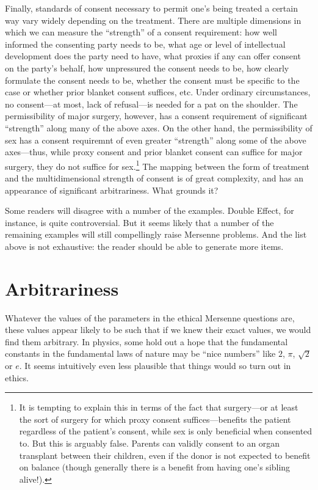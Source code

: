 Finally, standards of consent necessary to permit one's being treated a certain way vary widely depending on the treatment.
There are multiple dimensions in which we can measure the ``strength'' of a consent requirement: how well informed the 
consenting party needs to be, what age or level of intellectual development does the party need to have, what proxies if
any can offer consent on the party's behalf, how unpressured the consent needs to be, how clearly formulate the consent
needs to be, whether the consent must be specific to the case or whether prior blanket consent suffices, etc.
Under ordinary circumstances, no consent---at most, lack of refusal---is needed for a pat on the shoulder. The permissibility
of major surgery, however, has a consent requirement of significant ``strength'' along many of the above axes. On the other hand,
the permissibility of sex has a consent requiremnt of even greater ``strength'' along some of the above axes---thus, while
proxy consent and prior blanket consent can suffice for major surgery, they do not suffice for sex.\footnote{It is tempting
to explain this in terms of the fact that surgery---or at least the sort of surgery for which proxy consent suffices---benefits 
the patient regardless of the patient's consent, while sex is only beneficial when consented to. But this is arguably false.
Parents can validly consent to an organ transplant between their children, even if the donor is not expected to benefit
on balance (though generally there is a benefit from having one's sibling alive!).} The mapping between
the form of treatment and the multidimensional strength of consent is of great complexity, and has an appearance of significant
arbitrariness. What grounds it?

Some readers will disagree with a number of the examples. Double Effect, for instance, is quite controversial. But it seems
likely that a number of the remaining examples will still compellingly raise Mersenne problems. And the list above is not
exhaustive: the reader should be able to generate more items.

\section{Arbitrariness}
Whatever the values of the parameters in the ethical Mersenne questions are, these values appear likely to be such 
that if we knew their exact values, we would find them arbitrary.
In physics, some hold out a hope that the fundamental constants in the fundamental laws of nature may be ``nice numbers'' like
$2$, $\pi$, $\sqrt 2$ or $e$. It seems intuitively even less plausible that things would so turn out in ethics. 

